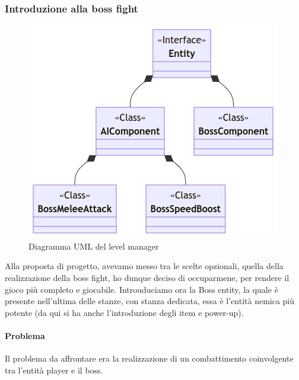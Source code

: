 \documentclass[a4paper,12pt]{report}
\begin{document}
\subsubsection*{Introduzione alla boss fight}

\begin{figure}[h]
	\centering
	\includegraphics[width=\textwidth]{uml/BossEntity1.png}
	\caption{Diagramma UML del level manager}
\end{figure}

Alla proposta di progetto, avevamo messo tra le scelte opzionali, quella della realizzazione della boss fight, ho dunque deciso di occuparmene, per rendere il gioco più completo e giocabile.
Introuduciamo ora la Boss entity, la quale è presente nell'ultima delle stanze, con stanza dedicata, essa è l'entità nemica più potente (da qui si ha anche l'introduzione degli item e power-up). 
\paragraph*{Problema}
Il problema da affrontare era la realizzazione di un combattimento coinvolgente tra l'entità player e il boss.
\end{document}

